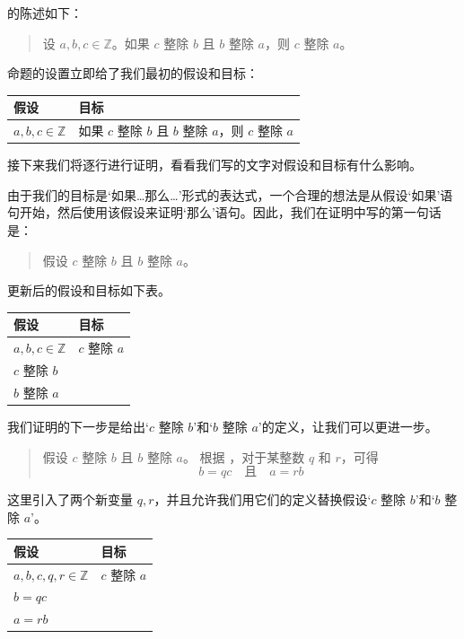 \begin{example}
\label{exAssumptionsGoals}
 的陈述如下：
\begin{quote}
设 $a,b,c \in \mathbb{Z}$。如果 $c$ 整除 $b$ 且 $b$ 整除 $a$，则 $c$ 整除 $a$。
\end{quote}
命题的设置立即给了我们最初的假设和目标：
\begin{center}
\begin{tabular}{C{150pt}|C{150pt}}
\textbf{假设} & \textbf{目标} \\ \hline
$a,b,c \in \mathbb{Z}$ & 如果 $c$ 整除 $b$ 且 $b$ 整除 $a$，则 $c$ 整除 $a$
\end{tabular}
\end{center}
接下来我们将逐行进行证明，看看我们写的文字对假设和目标有什么影响。

由于我们的目标是`如果\dots{}那么\dots{}'形式的表达式，一个合理的想法是从假设`如果'语句开始，然后使用该假设来证明`那么'语句。因此，我们在证明中写的第一句话是：
\begin{quote}
假设 $c$ 整除 $b$ 且 $b$ 整除 $a$。
\end{quote}
更新后的假设和目标如下表。
\begin{center}
\begin{tabular}{C{150pt}|C{150pt}}
\textbf{假设} & \textbf{目标} \\ \hline
$a,b,c \in \mathbb{Z}$ & $c$ 整除 $a$ \\
$c$ 整除 $b$ & \\
$b$ 整除 $a$ & 
\end{tabular}
\end{center}

我们证明的下一步是给出`$c$ 整除 $b$'和`$b$ 整除 $a$'的定义，让我们可以更进一步。

\begin{quote}
{\color{gray} 假设 $c$ 整除 $b$ 且 $b$ 整除 $a$。} 根据 ，对于某整数 $q$ 和 $r$，可得
\[
b=qc \quad \text{且} \quad a=rb
\]
\end{quote}

这里引入了两个新变量 $q,r$，并且允许我们用它们的定义替换假设`$c$ 整除 $b$'和`$b$ 整除 $a$'。

\begin{center}
\begin{tabular}{C{150pt}|C{150pt}}
\textbf{假设} & \textbf{目标} \\ \hline
$a,b,c,q,r \in \mathbb{Z}$ & $c$ 整除 $a$ \\
$b=qc$ & \\
$a=rb$ &
\end{tabular}
\end{center}


\end{example}
